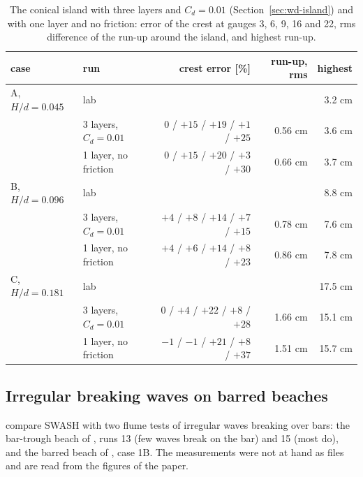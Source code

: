 \begin{table}[htbp]
\centering
\caption{The conical island \citep{briggs1995} with three layers and
$C_d = 0.01$ (Section~\ref{sec:wd-island}) and with one layer and no
friction: error of the crest at gauges 3, 6, 9, 16 and 22, rms difference
of the run-up around the island, and highest run-up.}
\label{tab:swash-island}
\footnotesize
\setlength{\tabcolsep}{4pt}
\begin{tabular}{llrrr}
\toprule
case & run & crest error [\%] & run-up, rms & highest \\
\midrule
A, $H/d = 0.045$ & lab & & & 3.2 cm \\
 & 3 layers, $C_d = 0.01$ & $0$ / $+15$ / $+19$ / $+1$ / $+25$ & 0.56 cm & 3.6 cm \\
 & 1 layer, no friction & $0$ / $+15$ / $+20$ / $+3$ / $+30$ & 0.66 cm & 3.7 cm \\
B, $H/d = 0.096$ & lab & & & 8.8 cm \\
 & 3 layers, $C_d = 0.01$ & $+4$ / $+8$ / $+14$ / $+7$ / $+15$ & 0.78 cm & 7.6 cm \\
 & 1 layer, no friction & $+4$ / $+6$ / $+14$ / $+8$ / $+23$ & 0.86 cm & 7.8 cm \\
C, $H/d = 0.181$ & lab & & & 17.5 cm \\
 & 3 layers, $C_d = 0.01$ & $0$ / $+4$ / $+22$ / $+8$ / $+28$ & 1.66 cm & 15.1 cm \\
 & 1 layer, no friction & $-1$ / $-1$ / $+21$ / $+8$ / $+37$ & 1.51 cm & 15.7 cm \\
\bottomrule
\end{tabular}
\end{table}

\subsection{Irregular breaking waves on barred beaches}
\label{sec:flumes}

\citet{zijlema2011} compare SWASH with two flume tests of irregular waves
breaking over bars: the bar-trough beach of \citet{battjes1978}, runs 13
(few waves break on the bar) and 15 (most do), and the barred beach of
\citet{boers1996}, case 1B. The measurements were not at hand as files and
are read from the figures of the paper.

